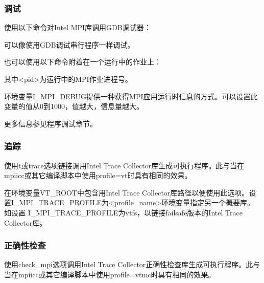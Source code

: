 \documentclass[a4paper,12pt,english]{sphinxmanual}
\begin{document}
\subsubsection{调试}
\label{\detokenize{mpi-application/mpi-application:id12}}
\sphinxAtStartPar
使用以下命令对Intel MPI库调用GDB调试器： 

\sphinxAtStartPar
可以像使用GDB调试串行程序一样调试。

\sphinxAtStartPar
也可以使用以下命令附着在一个运行中的作业上：

\sphinxAtStartPar
{}

\sphinxAtStartPar
其中<pid>为运行中的MPI作业进程号。

\sphinxAtStartPar
环境变量I\_MPI\_DEBUG提供一种获得MPI应用运行时信息的方式。可以设置此变量的值从0到1000，值越大，信息量越大。

\sphinxAtStartPar
{}

\sphinxAtStartPar
更多信息参见程序调试章节。


\subsubsection{追踪}
\label{\detokenize{mpi-application/mpi-application:id13}}
\sphinxAtStartPar
使用\sphinxhyphen{}t或\sphinxhyphen{}trace选项链接调用Intel Trace Collector库生成可执行程序。此与当在mpiicc或其它编译脚本中使用\sphinxhyphen{}profile=vt时具有相同的效果。

\sphinxAtStartPar
{}

\sphinxAtStartPar
在环境变量VT\_ROOT中包含用Intel Trace Collector库路径以便使用此选项。设置I\_MPI\_TRACE\_PROFILE为<profile\_name>环境变量指定另一个概要库。如设置
I\_MPI\_TRACE\_PROFILE为vtfs，以链接fail\sphinxhyphen{}safe版本的Intel Trace Collector库。


\subsubsection{正确性检查}
\label{\detokenize{mpi-application/mpi-application:id14}}
\sphinxAtStartPar
使用\sphinxhyphen{}check\_mpi选项调用Intel Trace Collector正确性检查库生成可执行程序。此与当在mpiicc或其它编译脚本中使用\sphinxhyphen{}profile=vtmc时具有相同的效果。
\end{document}
